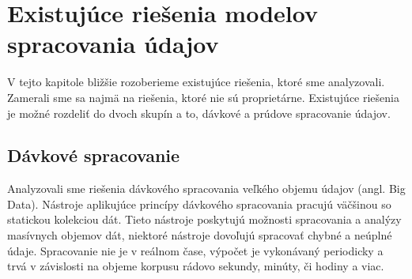 \chapter{Existujúce riešenia modelov spracovania údajov}
\label{Existing solutions of data stream analysis} 
V tejto kapitole bližšie rozoberieme existujúce riešenia, ktoré sme analyzovali. Zamerali sme sa najmä na riešenia, ktoré nie sú proprietárne. Existujúce riešenia je možné rozdeliť do dvoch skupín a to, dávkové a prúdove spracovanie údajov. 

\section{Dávkové spracovanie}
Analyzovali sme riešenia dávkového spracovania veľkého objemu údajov (angl. Big Data). Nástroje aplikujúce princípy dávkového spracovania pracujú väčšinou so statickou kolekciou dát. Tieto nástroje poskytujú možnosti spracovania a analýzy masívnych objemov dát, niektoré nástroje dovoľujú spracovať chybné a neúplné údaje. Spracovanie nie je v reálnom čase, výpočet je vykonávaný periodicky a trvá v závislosti na objeme korpusu rádovo sekundy, minúty, či hodiny a viac.

